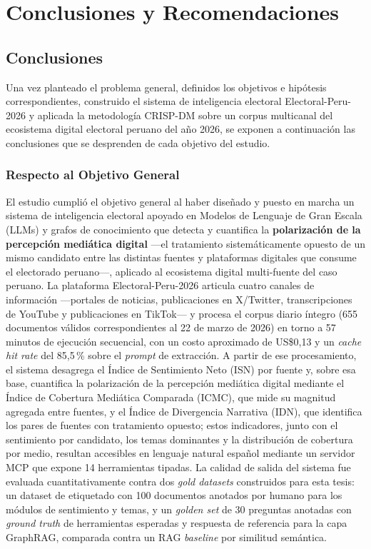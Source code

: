 \chapter{Conclusiones y Recomendaciones}

\section{Conclusiones}
Una vez planteado el problema general, definidos los objetivos e hipótesis correspondientes, construido el sistema de inteligencia electoral Electoral-Peru-2026 y aplicada la metodología CRISP-DM sobre un corpus multicanal del ecosistema digital electoral peruano del año 2026, se exponen a continuación las conclusiones que se desprenden de cada objetivo del estudio.

\subsection*{Respecto al Objetivo General}
El estudio cumplió el objetivo general al haber diseñado y puesto en marcha un sistema de inteligencia electoral apoyado en Modelos de Lenguaje de Gran Escala (LLMs) y grafos de conocimiento que detecta y cuantifica la \textbf{polarización de la percepción mediática digital} —el tratamiento sistemáticamente opuesto de un mismo candidato entre las distintas fuentes y plataformas digitales que consume el electorado peruano—, aplicado al ecosistema digital multi-fuente del caso peruano. La plataforma Electoral-Peru-2026 articula cuatro canales de información —portales de noticias, publicaciones en X/Twitter, transcripciones de YouTube y publicaciones en TikTok— y procesa el corpus diario íntegro (655 documentos válidos correspondientes al 22 de marzo de 2026) en torno a 57 minutos de ejecución secuencial, con un costo aproximado de US\$0{,}13 y un \textit{cache hit rate} del 85{,}5\,\% sobre el \textit{prompt} de extracción. A partir de ese procesamiento, el sistema desagrega el Índice de Sentimiento Neto (ISN) por fuente y, sobre esa base, cuantifica la polarización de la percepción mediática digital mediante el Índice de Cobertura Mediática Comparada (ICMC), que mide su magnitud agregada entre fuentes, y el Índice de Divergencia Narrativa (IDN), que identifica los pares de fuentes con tratamiento opuesto; estos indicadores, junto con el sentimiento por candidato, los temas dominantes y la distribución de cobertura por medio, resultan accesibles en lenguaje natural español mediante un servidor MCP que expone 14 herramientas tipadas. La calidad de salida del sistema fue evaluada cuantitativamente contra dos \textit{gold datasets} construidos para esta tesis: un dataset de etiquetado con 100 documentos anotados por humano para los módulos de sentimiento y temas, y un \textit{golden set} de 30 preguntas anotadas con \textit{ground truth} de herramientas esperadas y respuesta de referencia para la capa GraphRAG, comparada contra un RAG \textit{baseline} por similitud semántica.

